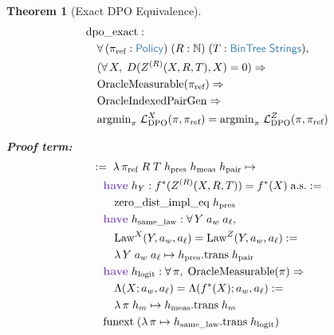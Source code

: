 \documentclass[11pt]{article}
\theoremstyle{definition}
\theoremstyle{plain}
\newtheorem{thmenv}{Theorem}
\newcommand{\kw}[1]{\textcolor{keyword}{\textbf{#1}}}
\newcommand{\ty}[1]{\textcolor{type}{\mathsf{#1}}}
\newcommand{\fn}[1]{\mathrm{#1}}
\newcommand{\lam}{\lambda\,}
\newcommand{\all}{\forall\,}
\newcommand{\Arr}{\Rightarrow}
\newcommand{\pf}{:=\;}
\newcommand{\Strings}{\ty{Strings}}
\newcommand{\N}{\mathbb{N}}
\newcommand{\fstar}{f^*}
\newcommand{\ZR}{Z^{(R)}}
\begin{document}
\begin{thmenv}[Exact DPO Equivalence]
\label{thm:dpo_exact}
\begin{align*}
&\fn{dpo\_exact} : \\
&\quad \all (\pi_{\text{ref}} : \ty{Policy})\; (R : \N)\; (T : \ty{BinTree}\;\Strings), \\
&\quad (\all X,\; D(\ZR(X, R, T), X) = 0) \Arr \\
&\quad \fn{OracleMeasurable}(\pi_{\text{ref}}) \Arr \\
&\quad \fn{OracleIndexedPairGen} \Arr \\
&\quad \fn{argmin}_\pi\; \mathcal{L}_{\text{DPO}}^X(\pi, \pi_{\text{ref}}) = \fn{argmin}_\pi\; \mathcal{L}_{\text{DPO}}^Z(\pi, \pi_{\text{ref}})
\end{align*}

\textbf{Proof term:}
\begin{align*}
&\pf \lam \pi_{\text{ref}}\; R\; T\; h_{\text{pres}}\; h_{\text{meas}}\; h_{\text{pair}} \mapsto \\
&\quad \kw{have}\; h_Y : \fstar(\ZR(X, R, T)) = \fstar(X) \;\text{a.s.} := \\
&\quad\quad \fn{zero\_dist\_impl\_eq}\; h_{\text{pres}} \\
&\quad \kw{have}\; h_{\text{same\_law}} : \all Y\; a_w\; a_\ell,\; \\
&\quad\quad \fn{Law}^X(Y, a_w, a_\ell) = \fn{Law}^Z(Y, a_w, a_\ell) := \\
&\quad\quad \lam Y\; a_w\; a_\ell \mapsto h_{\text{pres}}.\fn{trans}\; h_{\text{pair}} \\
&\quad \kw{have}\; h_{\text{logit}} : \all \pi,\; \fn{OracleMeasurable}(\pi) \Arr \\
&\quad\quad \Lambda(X; a_w, a_\ell) = \Lambda(\fstar(X); a_w, a_\ell) := \\
&\quad\quad \lam \pi\; h_m \mapsto h_{\text{meas}}.\fn{trans}\; h_m \\
&\quad \fn{funext}\; (\lam \pi \mapsto h_{\text{same\_law}}.\fn{trans}\; h_{\text{logit}})
\end{align*}
\end{thmenv}
\end{document}
